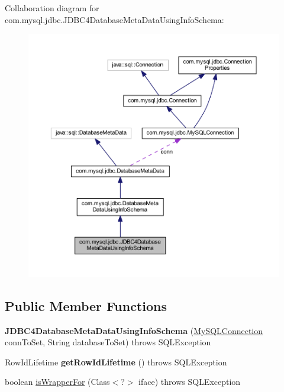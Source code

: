 Collaboration diagram for com.\+mysql.\+jdbc.\+J\+D\+B\+C4\+Database\+Meta\+Data\+Using\+Info\+Schema\+:
\nopagebreak
\begin{figure}[H]
\begin{center}
\leavevmode
\includegraphics[width=350pt]{classcom_1_1mysql_1_1jdbc_1_1_j_d_b_c4_database_meta_data_using_info_schema__coll__graph}
\end{center}
\end{figure}
\subsection*{Public Member Functions}
\begin{DoxyCompactItemize}
\item 
\mbox{\label{classcom_1_1mysql_1_1jdbc_1_1_j_d_b_c4_database_meta_data_using_info_schema_a9b9454734c971fcf9b202a18e087ecb5}} 
{\bfseries J\+D\+B\+C4\+Database\+Meta\+Data\+Using\+Info\+Schema} (\mbox{\hyperlink{interfacecom_1_1mysql_1_1jdbc_1_1_my_s_q_l_connection}{My\+S\+Q\+L\+Connection}} conn\+To\+Set, String database\+To\+Set)  throws S\+Q\+L\+Exception 
\item 
\mbox{\label{classcom_1_1mysql_1_1jdbc_1_1_j_d_b_c4_database_meta_data_using_info_schema_a0109a21a61bc95c28c693bdf1c0de6ca}} 
Row\+Id\+Lifetime {\bfseries get\+Row\+Id\+Lifetime} ()  throws S\+Q\+L\+Exception 
\item 
boolean \mbox{\hyperlink{classcom_1_1mysql_1_1jdbc_1_1_j_d_b_c4_database_meta_data_using_info_schema_acd0cee48f76616614ae8a8f1b535f5a8}{is\+Wrapper\+For}} (Class$<$?$>$ iface)  throws S\+Q\+L\+Exception 
\end{DoxyCompactItemize}

